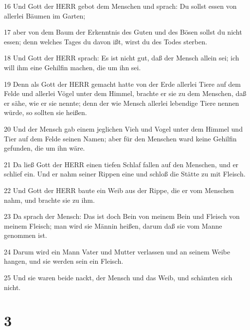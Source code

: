 \par 16 Und Gott der HERR gebot dem Menschen und sprach: Du sollst essen von allerlei Bäumen im Garten;
\par 17 aber von dem Baum der Erkenntnis des Guten und des Bösen sollst du nicht essen; denn welches Tages du davon ißt, wirst du des Todes sterben.
\par 18 Und Gott der HERR sprach: Es ist nicht gut, daß der Mensch allein sei; ich will ihm eine Gehilfin machen, die um ihn sei.
\par 19 Denn als Gott der HERR gemacht hatte von der Erde allerlei Tiere auf dem Felde und allerlei Vögel unter dem Himmel, brachte er sie zu dem Menschen, daß er sähe, wie er sie nennte; denn der wie Mensch allerlei lebendige Tiere nennen würde, so sollten sie heißen.
\par 20 Und der Mensch gab einem jeglichen Vieh und Vogel unter dem Himmel und Tier auf dem Felde seinen Namen; aber für den Menschen ward keine Gehilfin gefunden, die um ihn wäre.
\par 21 Da ließ Gott der HERR einen tiefen Schlaf fallen auf den Menschen, und er schlief ein. Und er nahm seiner Rippen eine und schloß die Stätte zu mit Fleisch.
\par 22 Und Gott der HERR baute ein Weib aus der Rippe, die er vom Menschen nahm, und brachte sie zu ihm.
\par 23 Da sprach der Mensch: Das ist doch Bein von meinem Bein und Fleisch von meinem Fleisch; man wird sie Männin heißen, darum daß sie vom Manne genommen ist.
\par 24 Darum wird ein Mann Vater und Mutter verlassen und an seinem Weibe hangen, und sie werden sein ein Fleisch.
\par 25 Und sie waren beide nackt, der Mensch und das Weib, und schämten sich nicht.

\chapter{3}

